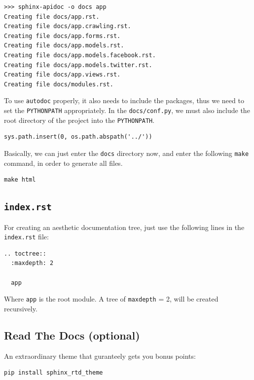 \documentclass[../main/main.tex]{subfiles}
\begin{document}
\begin{lstlisting}
>>> sphinx-apidoc -o docs app
Creating file docs/app.rst.
Creating file docs/app.crawling.rst.
Creating file docs/app.forms.rst.
Creating file docs/app.models.rst.
Creating file docs/app.models.facebook.rst.
Creating file docs/app.models.twitter.rst.
Creating file docs/app.views.rst.
Creating file docs/modules.rst.
\end{lstlisting}

To use \lstinline|autodoc| properly, it also needs to include the packages, thus
we need to set the \lstinline|PYTHONPATH| appropriately. In the
\lstinline|docs/conf.py|, we must also include the root directory of the project
into the \lstinline|PYTHONPATH|. 

\begin{lstlisting}[caption=docs/conf.py, label=lst:sphinxconfpy]
sys.path.insert(0, os.path.abspath('../'))
\end{lstlisting}

Basically, we can just enter the \lstinline|docs| directory now, and enter the
following \lstinline|make| command, in order to generate all files. 

\begin{lstlisting}
make html
\end{lstlisting}

\subsection{\lstinline|index.rst|}

For creating an aesthetic documentation tree, just use the following lines in
the \lstinline|index.rst| file: 

\begin{lstlisting}
.. toctree::
  :maxdepth: 2

  app
\end{lstlisting}

Where \lstinline|app| is the root module. A tree of \lstinline|maxdepth| = 2,
will be created recursively.  


\subsection{Read The Docs (optional)}
An extraordinary theme that guranteely gets you bonus points:

\begin{lstlisting}
pip install sphinx_rtd_theme
\end{lstlisting}
\end{document}
